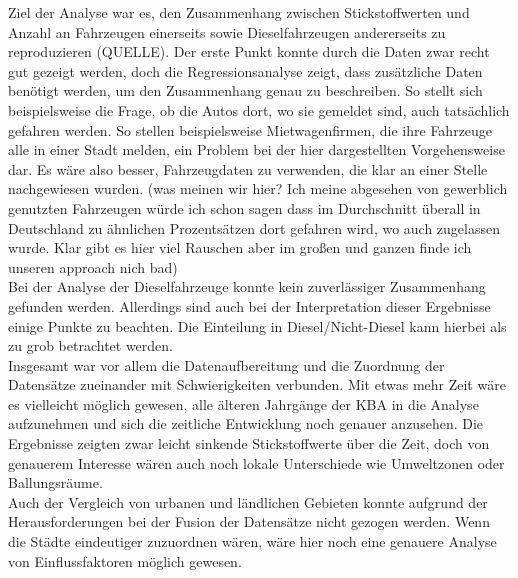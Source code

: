 \documentclass[11pt,a4paper,oneside,german]{article}
\begin{document}
	Ziel der Analyse war es, den Zusammenhang zwischen Stickstoffwerten und Anzahl an Fahrzeugen einerseits sowie Dieselfahrzeugen andererseits zu reproduzieren (QUELLE). Der erste Punkt konnte durch die Daten zwar recht gut gezeigt werden, doch die Regressionsanalyse zeigt, dass zusätzliche Daten benötigt werden, um den Zusammenhang genau zu beschreiben. So stellt sich beispielsweise die Frage, ob die Autos dort, wo sie gemeldet sind, auch tatsächlich gefahren werden. So stellen beispielsweise Mietwagenfirmen, die ihre Fahrzeuge alle in einer Stadt melden, ein Problem bei der hier dargestellten Vorgehensweise dar. Es wäre also besser, Fahrzeugdaten zu verwenden, die klar an einer Stelle nachgewiesen wurden. (was meinen wir hier? Ich meine abgesehen von gewerblich genutzten Fahrzeugen würde ich schon sagen dass im Durchschnitt überall in Deutschland zu ähnlichen Prozentsätzen dort gefahren wird, wo auch zugelassen wurde. Klar gibt es hier viel Rauschen aber im großen und ganzen finde ich unseren approach nich bad) \\
	Bei der Analyse der Dieselfahrzeuge konnte kein zuverlässiger Zusammenhang gefunden werden. Allerdings sind auch bei der Interpretation dieser Ergebnisse einige Punkte zu beachten. Die Einteilung in Diesel/Nicht-Diesel kann hierbei als zu grob betrachtet werden. \\
	Insgesamt war vor allem die Datenaufbereitung und die Zuordnung der Datensätze zueinander mit Schwierigkeiten verbunden. Mit etwas mehr Zeit wäre es vielleicht möglich gewesen, alle älteren Jahrgänge der KBA in die Analyse aufzunehmen und sich die zeitliche Entwicklung noch genauer anzusehen. Die Ergebnisse zeigten zwar leicht sinkende Stickstoffwerte über die Zeit, doch von genauerem Interesse wären auch noch lokale Unterschiede wie Umweltzonen oder Ballungsräume. \\
	Auch der Vergleich von urbanen und ländlichen Gebieten konnte aufgrund der Herausforderungen bei der Fusion der Datensätze nicht gezogen werden. Wenn die Städte eindeutiger zuzuordnen wären, wäre hier noch eine genauere Analyse von Einflussfaktoren möglich gewesen. \\
	
\end{document}
